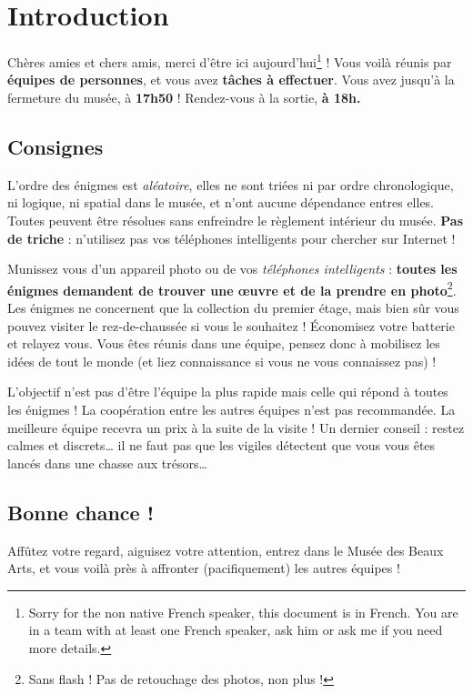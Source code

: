 \chapter{Introduction}

\vspace*{-30pt}

Chères amies et chers amis, merci d'être ici aujourd'hui\footnote{Sorry for the non native French speaker, this document is in French. You are in a team with at least one French speaker, ask him or ask me if you need more details.} !
%
Vous voilà réunis par \textbf{équipes de \intervalparequipe{} personnes},
et vous avez \textbf{\nbenigmes{} tâches à effectuer}.
%
Vous avez jusqu'à la fermeture du musée, à \textbf{17h50} !
%
Rendez-vous à la sortie, \textbf{à 18h.}


\section*{Consignes}

L'ordre des énigmes est \emph{aléatoire}, elles ne sont triées ni par ordre chronologique, ni logique, ni spatial dans le musée, et n'ont aucune dépendance entres elles.
%
Toutes peuvent être résolues sans enfreindre le règlement intérieur du musée.
\textbf{Pas de triche} : n'utilisez pas vos téléphones intelligents pour chercher sur Internet !

Munissez vous d'un appareil photo ou de vos \emph{téléphones intelligents} : \textbf{toutes les énigmes demandent de trouver une œuvre et de la prendre en photo}\footnote{Sans flash ! Pas de retouchage des photos, non plus !}.
Les énigmes ne concernent que la collection du premier étage, mais bien sûr vous pouvez visiter le rez-de-chaussée si vous le souhaitez !
Économisez votre batterie et relayez vous.
%
Vous êtes réunis dans une équipe, pensez donc à mobilisez les idées de tout le monde (et liez connaissance si vous ne vous connaissez pas) !

L'objectif n'est pas d'être l'équipe la plus rapide mais celle qui répond à toutes les énigmes !
La coopération entre les autres équipes n'est pas recommandée.
La meilleure équipe recevra un prix à la suite de la visite !
%
Un dernier conseil : restez calmes et discrets… il ne faut pas que les vigiles détectent que vous vous êtes lancés dans une chasse aux trésors…


\section*{Bonne chance !}
Affûtez votre regard, aiguisez votre attention, entrez dans le Musée des Beaux Arts, et vous voilà près à affronter (pacifiquement) les autres équipes !
